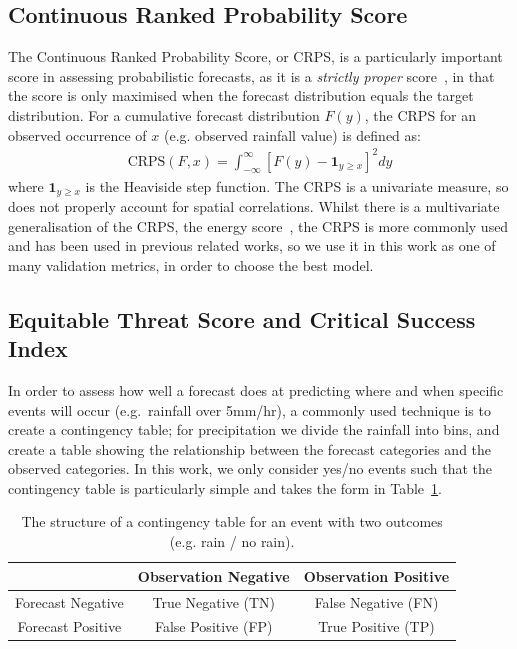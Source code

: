 \documentclass[../main.tex]{subfiles}
\begin{document}
\subsection{Continuous Ranked Probability Score}

The Continuous Ranked Probability Score, or CRPS, is a particularly important score in assessing probabilistic forecasts, as it is a \emph{strictly proper} score~\citep{wilks_statistical_2019}, in that the score is only maximised when the forecast distribution equals the target distribution. For a cumulative forecast distribution $F(y)$, the CRPS for an observed occurrence of $x$ (e.g. observed rainfall value) is defined as:
\begin{align}
    \text{CRPS}(F, x)= \int_{-\infty}^{\infty} \left[ F(y) - \mathbf{1}_{y\geq x} \right]^2
dy\end{align}
where $\mathbf{1}_{y\geq x}$ is the Heaviside step function. The CRPS is a univariate measure, so does not properly account for spatial correlations. Whilst there is a multivariate generalisation of the CRPS, the energy score~\citep{gneiting_strictly_2007}, the CRPS is more commonly used and has been used in previous related works, so we use it in this work as one of many validation metrics, in order to choose the best model. 





\subsection{Equitable Threat Score and Critical Success Index}
\label{metrics:ets}
In order to assess how well a forecast does at predicting where and when specific events will occur (e.g.~rainfall over 5mm/hr), a commonly used technique is to create a contingency table; for precipitation we divide the rainfall into bins, and create a table showing the relationship between the forecast categories and the observed categories. In this work, we only consider yes/no events such that the contingency table is particularly simple and takes the form in Table~\ref{tab:contingency}.
\begin{table}[]
    \centering
    \begin{tabular}{c|c c}
    & Observation Negative & Observation Positive\\
    \hline
      Forecast Negative & True Negative (TN) &  False Negative (FN) \\
      Forecast Positive & False Positive (FP) &  True Positive (TP)
    \end{tabular}
    \caption{The structure of a contingency table for an event with two outcomes (e.g. rain / no rain).}
    \label{tab:contingency}
\end{table}
\end{document}
